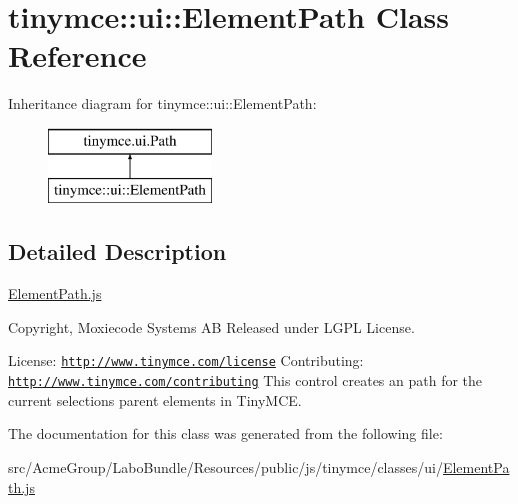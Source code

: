 \hypertarget{classtinymce_1_1ui_1_1_element_path}{\section{tinymce\+:\+:ui\+:\+:Element\+Path Class Reference}
\label{classtinymce_1_1ui_1_1_element_path}
}
Inheritance diagram for tinymce\+:\+:ui\+:\+:Element\+Path\+:\begin{figure}[H]
\begin{center}
\leavevmode
\includegraphics[height=2.000000cm]{classtinymce_1_1ui_1_1_element_path}
\end{center}
\end{figure}


\subsection{Detailed Description}
\hyperlink{_element_path_8js}{Element\+Path.\+js}

Copyright, Moxiecode Systems A\+B Released under L\+G\+P\+L License.

License\+: \href{http://www.tinymce.com/license}{\tt http\+://www.\+tinymce.\+com/license} Contributing\+: \href{http://www.tinymce.com/contributing}{\tt http\+://www.\+tinymce.\+com/contributing} This control creates an path for the current selections parent elements in Tiny\+M\+C\+E. 

The documentation for this class was generated from the following file\+:\begin{DoxyCompactItemize}
\item 
src/\+Acme\+Group/\+Labo\+Bundle/\+Resources/public/js/tinymce/classes/ui/\hyperlink{_element_path_8js}{Element\+Path.\+js}\end{DoxyCompactItemize}
